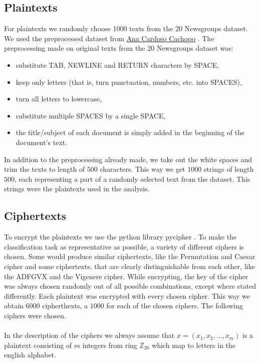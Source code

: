 \documentclass[a4paper]{article}
\begin{document}
\subsection{Plaintexts}
For plaintexts we randomly choose 1000 texts from the 20 Newsgroups dataset. We used the preprocessed dataset from \href{http://ana.cachopo.org/datasets-for-single-label-text-categorization}{Ana Cardoso Cachopo} \cite{2007:phd-Ana-Cardoso-Cachopo}. The preprocessing made on original texts from the 20 Newsgroups dataset was:

\begin{itemize}	
	\setlength\itemsep{-0.2em}
    \item substitute TAB, NEWLINE and RETURN characters by SPACE,
    \item keep only letters (that is, turn punctuation, numbers, etc. into SPACES),
    \item turn all letters to lowercase,
    \item substitute multiple SPACES by a single SPACE,
    \item the title/subject of each document is simply added in the beginning of the document's text.
\end{itemize}


In addition to the preprocessing already made, we take out the white spaces and trim the texts to length of $500$ characters. This way we get $1000$ strings of length $500$, each representing a part of a randomly selected text from the dataset. This strings were the plaintexts used in the analysis.

\subsection{Ciphertexts}
To encrypt the plaintexts we use the python library pycipher \cite{pycipher}. To make the classification task as representative as possible, a variety of different ciphers is chosen. Some would produce similar ciphertexts, like the Permutation and Caesar cipher and some ciphertexts, that are clearly distinguishable from each other, like the ADFGVX and the Vigenere cipher. While encrypting, the key of the cipher was always chosen randomly out of all possible combinations, except where stated differently. Each plaintext was encrypted with every chosen cipher. This way we obtain $6000$ cipherthexts, a $1000$ for each of the chosen ciphers. The following ciphers were chosen.\\
\\
In the description of the ciphers we always assume that $x = (x_{1}, x_{2}, ...,x_{m})$ is a plaintext consisting of $m$ integers from ring $\mathbb{Z}_{26}$ which map to letters in the english alphabet.
\end{document}
